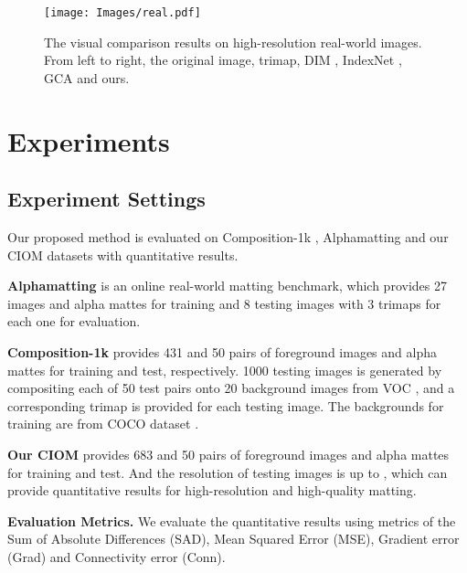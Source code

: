 \documentclass[10pt,twocolumn,letterpaper]{article}
\begin{document}
\begin{figure*}[h]
	\centering
	\texttt{[image: Images/real.pdf]}
	\caption{The visual comparison results on high-resolution real-world images. From left to right, the original image, trimap, DIM \cite{deepmatting}, IndexNet \cite{indexnet}, GCA \cite{gca} and ours. }
	\label{fig:real}
\end{figure*}

\section{Experiments}
\subsection{Experiment Settings}

Our proposed method is evaluated on Composition-1k \cite{deepmatting}, Alphamatting \cite{alphamatting} and our CIOM datasets with  quantitative results.

\textbf{Alphamatting} \cite{alphamatting} is an online real-world matting benchmark,
which provides 27 images and alpha mattes for training and 8 testing images with 3 trimaps for each one for evaluation.

\textbf{Composition-1k} \cite{deepmatting} provides 431 and 50 pairs of foreground images and alpha mattes for training and test, respectively. 1000 testing images is generated by compositing each of 50 test pairs onto 20 background images from VOC \cite{voc}, and a corresponding trimap is provided for each testing image. The backgrounds for training are from COCO dataset \cite{coco}.

\textbf{Our CIOM} provides 683 and 50 pairs of foreground images and alpha mattes for training and test. And the resolution of testing images is up to , which can provide quantitative results for high-resolution and high-quality matting.

\textbf{Evaluation Metrics.}  We evaluate the quantitative results using metrics of the Sum of Absolute Differences (SAD),
Mean Squared Error (MSE), Gradient error (Grad) and Connectivity error (Conn).
\end{document}
